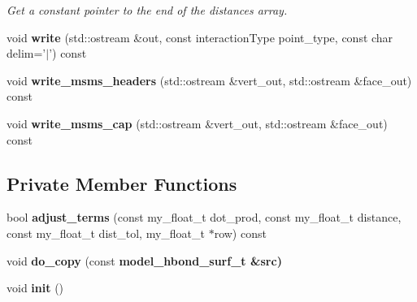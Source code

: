 \begin{CompactItemize}
\begin{CompactList}\small\item\em Get a constant pointer to the end of the distances array. \item\end{CompactList}\item 
void \textbf{write} (std::ostream \&out, const interaction\-Type point\_\-type, const char delim='$|$') const \label{classSimSite3D_1_1model__hbond__surf__t_2c3b46d219e290bd39bf60cdc9210fcc}

\item 
void \textbf{write\_\-msms\_\-headers} (std::ostream \&vert\_\-out, std::ostream \&face\_\-out) const \label{classSimSite3D_1_1model__hbond__surf__t_ac5245563487a78bec4f41d973dae1ef}

\item 
void \textbf{write\_\-msms\_\-cap} (std::ostream \&vert\_\-out, std::ostream \&face\_\-out) const \label{classSimSite3D_1_1model__hbond__surf__t_b7a5a82b5ba33c13c2f1fde5e2c68e93}

\end{CompactItemize}
\subsection*{Private Member Functions}
\begin{CompactItemize}
\item 
bool \textbf{adjust\_\-terms} (const my\_\-float\_\-t dot\_\-prod, const my\_\-float\_\-t distance, const my\_\-float\_\-t dist\_\-tol, my\_\-float\_\-t $\ast$row) const \label{classSimSite3D_1_1model__hbond__surf__t_258b7159aac2ffbbe568db054127092f}

\item 
void \textbf{do\_\-copy} (const \bf{model\_\-hbond\_\-surf\_\-t} \&src)\label{classSimSite3D_1_1model__hbond__surf__t_695c87b6533ec81d5780c82fff1a6aed}

\item 
void \textbf{init} ()\label{classSimSite3D_1_1model__hbond__surf__t_864c86053b4b227a58f820bb73d46064}

\end{CompactItemize}

